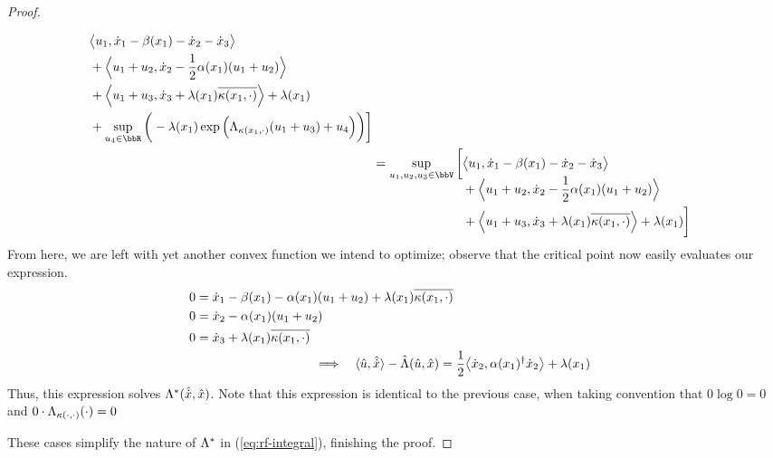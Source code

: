 \begin{proof}
\begin{enumerate}
\begin{align*}
\begin{aligned}[t]
          & \bprj{\momentVar_1}{\diffVar_1 - \affDrift(\stateVar_1) - \diffVar_2 - \diffVar_3} \\
          &+ \Bprj{\momentVar_1+\momentVar_2}{\diffVar_2 
          - \frac12\affDiff(\stateVar_1)(\momentVar_1+\momentVar_2)} \\
          &+ \Bprj{\momentVar_1+\momentVar_3}{\diffVar_3 + \affInt(\stateVar_1)\overline{\affDist(\stateVar_1,\cdot)}} 
          + \affInt(\stateVar_1) \\
          &+ \sup_{\momentVar_4 \in \bbR} \bigg(- \affInt(\stateVar_1) \exp\Big(\ode_{\affDist(\stateVar_1,\cdot)}(\momentVar_1+\momentVar_3) + \momentVar_4\Big) \bigg)
          \bigg]
        \end{aligned} \\
        &= \sup_{\momentVar_1,\momentVar_2,\momentVar_3 \in \vecSpace} \bigg[ \begin{aligned}[t]
          & \bprj{\momentVar_1}{\diffVar_1 - \affDrift(\stateVar_1) - \diffVar_2 - \diffVar_3}  \\
          &+ \Bprj{\momentVar_1+\momentVar_2}{\diffVar_2 
          - \frac12\affDiff(\stateVar_1)(\momentVar_1+\momentVar_2)} \\
          &+ \Bprj{\momentVar_1+\momentVar_3}{\diffVar_3 + \affInt(\stateVar_1)\overline{\affDist(\stateVar_1,\cdot)}} 
          + \affInt(\stateVar_1) 
          \bigg]
        \end{aligned}
      \end{align*}
      From here, we are left with yet another convex function we intend to optimize; observe that the critical point now easily evaluates our expression.
      \begin{align*}
        &\begin{aligned}
          0 &= \diffVar_1 - \affDrift(\stateVar_1) - \affDiff(\stateVar_1) (\momentVar_1 + \momentVar_2) + \affInt(\stateVar_1) \overline{\affDist(\stateVar_1, \cdot)} \\
          0 &= \diffVar_2 - \affDiff(\stateVar_1) ( \momentVar_1 + \momentVar_2 ) \\
          0 &= \diffVar_3 + \affInt(\stateVar_1) \overline{\affDist(\stateVar_1, \cdot)} 
        \end{aligned} \\
        &\hspace{35mm}\Longrightarrow\quad
        \begin{aligned}[t]
          \prj{\hat\momentVar}{\hat\diffVar} - \hat\ode(\hat\momentVar,\hat\stateVar)
          &= \frac12 \bprj{\diffVar_2}{\affDiff(\stateVar_1)^\dagger\diffVar_2} + \affInt(\stateVar_1)
        \end{aligned}
      \end{align*}
      Thus, this expression solves $\Lambda^*(\hat{\dot{x}},\hat{x})$.
      Note that this expression is identical to the previous case, when taking convention that $0 \log 0 = 0$ and $0 \cdot \Lambda_{\kappa(\cdot,\cdot)}(\cdot) = 0$
  \end{enumerate}
  These cases simplify the nature of $\Lambda^*$ in (\ref{eq:rf-integral}), finishing the proof.
\end{proof}
